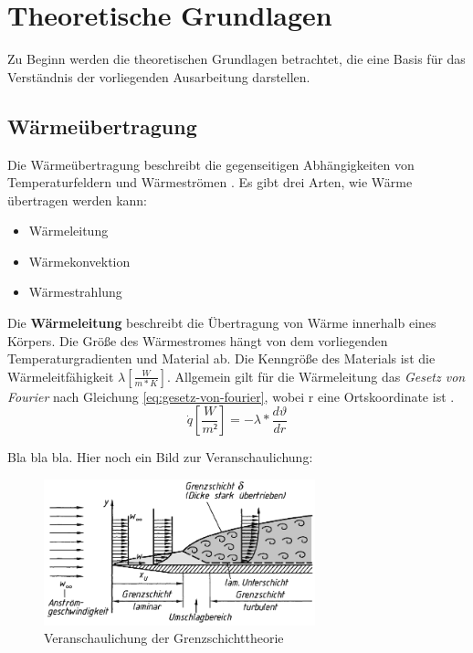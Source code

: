 \section{Theoretische Grundlagen}
\label{sec:grundlagen}
Zu Beginn werden die theoretischen Grundlagen betrachtet, die eine Basis für das Verständnis der vorliegenden Ausarbeitung darstellen.
	\subsection{Wärmeübertragung}
	\label{sec:waermeuebertragung}
Die Wärmeübertragung beschreibt die gegenseitigen Abhängigkeiten von Temperaturfeldern und Wärmeströmen \cite{Langeheinecke2008}. Es gibt drei Arten, wie Wärme übertragen werden kann:
\begin{itemize}
	\item Wärmeleitung
	\item Wärmekonvektion
	\item Wärmestrahlung
\end{itemize}
Die \textbf{Wärmeleitung} beschreibt die Übertragung von Wärme innerhalb eines Körpers. Die Größe des Wärmestromes hängt von dem vorliegenden Temperaturgradienten und Material ab. Die Kenngröße des Materials ist die Wärmeleitfähigkeit $\lambda \left[\frac{W}{m*K}\right]$. Allgemein gilt für die Wärmeleitung das \textit{Gesetz von Fourier} nach Gleichung \ref{eq:gesetz-von-fourier}, wobei r eine Ortskoordinate ist \cite{Boeckh2015}.
\begin{equation}
	\label{eq:gesetz-von-fourier}
	\dot{q} \left[\frac{W}{m²}\right]=-\lambda*\frac{d\vartheta}{dr} 
\end{equation}

Bla bla bla. Hier noch ein Bild zur Veranschaulichung:

\begin{figure}[h]
	\centering
	\includegraphics[width=0.7\textwidth]{Bilder/grenzschichttheorie}
	\caption{Veranschaulichung der Grenzschichttheorie \cite{Boeswirth2014}}
	\label{img:grenzschichttheorie}
\end{figure}

